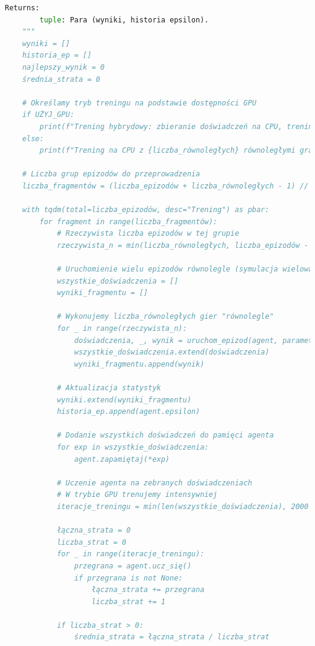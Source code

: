 \documentclass[a4paper,12pt]{article}
\begin{document}
\begin{lstlisting}[language=Python]
    Returns:
        tuple: Para (wyniki, historia epsilon).
    """
    wyniki = []
    historia_ep = []
    najlepszy_wynik = 0
    średnia_strata = 0
    
    # Określamy tryb treningu na podstawie dostępności GPU
    if UŻYJ_GPU:
        print(f"Trening hybrydowy: zbieranie doświadczeń na CPU, trening na GPU.")
    else:
        print(f"Trening na CPU z {liczba_równoległych} równoległymi grami.")
    
    # Liczba grup epizodów do przeprowadzenia
    liczba_fragmentów = (liczba_epizodów + liczba_równoległych - 1) // liczba_równoległych
    
    with tqdm(total=liczba_epizodów, desc="Trening") as pbar:
        for fragment in range(liczba_fragmentów):
            # Rzeczywista liczba epizodów w tej grupie
            rzeczywista_n = min(liczba_równoległych, liczba_epizodów - fragment * liczba_równoległych)
            
            # Uruchomienie wielu epizodów równolegle (symulacja wielowątkowości)
            wszystkie_doświadczenia = []
            wyniki_fragmentu = []
            
            # Wykonujemy liczba_równoległych gier "równolegle"
            for _ in range(rzeczywista_n):
                doświadczenia, _, wynik = uruchom_epizod(agent, parametry_gry)
                wszystkie_doświadczenia.extend(doświadczenia)
                wyniki_fragmentu.append(wynik)
            
            # Aktualizacja statystyk
            wyniki.extend(wyniki_fragmentu)
            historia_ep.append(agent.epsilon)
            
            # Dodanie wszystkich doświadczeń do pamięci agenta
            for exp in wszystkie_doświadczenia:
                agent.zapamiętaj(*exp)
            
            # Uczenie agenta na zebranych doświadczeniach
            # W trybie GPU trenujemy intensywniej
            iteracje_treningu = min(len(wszystkie_doświadczenia), 2000 if UŻYJ_GPU else 1000)
            
            łączna_strata = 0
            liczba_strat = 0
            for _ in range(iteracje_treningu):
                przegrana = agent.ucz_się()
                if przegrana is not None:
                    łączna_strata += przegrana
                    liczba_strat += 1
            
            if liczba_strat > 0:
                średnia_strata = łączna_strata / liczba_strat
            

\end{lstlisting}
\end{document}
